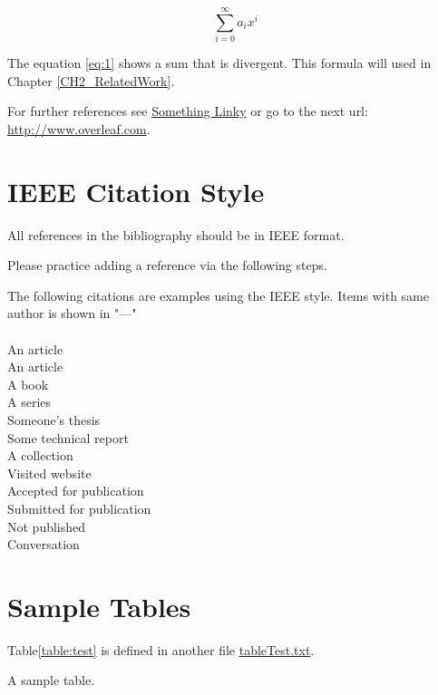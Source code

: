 \begin{equation}
\label{eq:1}
\sum_{i=0}^{\infty} a_i x^i
\end{equation}

The equation \ref{eq:1} shows a sum that is divergent. This formula 
will used in Chapter \ref{CH2_RelatedWork}.

For further references see \href{http://www.overleaf.com}{Something 
Linky} or go to the next url: \url{http://www.overleaf.com}.

\section{IEEE Citation Style}

All references in the bibliography should be in IEEE format.  

Please practice adding a reference via the following steps.  

The following citations are examples using the IEEE style. 
 Items with same author is shown in "---"\\
 \\

\noindent An article \cite{anarticle}\\
An article \cite{anarticle2}\\
A book \cite{abook}\\
A series \cite{bookseries}\\
Someone's thesis \cite{thesis}\\
Some technical report \cite{report}\\
A collection \cite{collection}\\
Visited website \cite{website}\\
Accepted for publication \cite{acceptedpub}\\
Submitted for publication \cite{unpub}\\
Not published \cite{notpub}\\
Conversation \cite{conv}\\

\section{Sample Tables}

Table\ref{table:test} is defined in another file \href{run:./tableTest.tex}{tableTest.txt}. 

\begin{table}[h!]
\scriptsize
\renewcommand{\tabcolsep}{0.09cm}
\centering

\caption{A sample table.}
\label{table:test}
\end{table}

